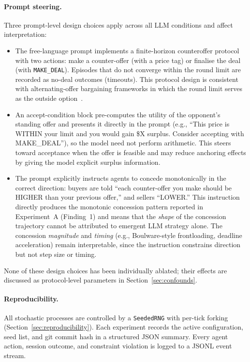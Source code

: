 \paragraph{Prompt steering.}
Three prompt-level design choices apply across all LLM conditions and affect interpretation:

\begin{itemize}
    \item The free-language prompt implements a finite-horizon counteroffer protocol with two actions: make a counter-offer (with a price tag) or finalise the deal (with \texttt{MAKE\_DEAL}).  Episodes that do not converge within the round limit are recorded as no-deal outcomes (timeouts).  This protocol design is consistent with alternating-offer bargaining frameworks in which the round limit serves as the outside option~\cite{rubinstein1982}.

    \item An accept-condition block pre-computes the utility of the opponent's standing offer and presents it directly in the prompt (e.g., ``This price is WITHIN your limit and you would gain \$X surplus.  Consider accepting with MAKE\_DEAL''), so the model need not perform arithmetic.  This steers toward acceptance when the offer is feasible and may reduce anchoring effects by giving the model explicit surplus information.

    \item The prompt explicitly instructs agents to concede monotonically in the correct direction: buyers are told ``each counter-offer you make should be HIGHER than your previous offer,'' and sellers ``LOWER.''  This instruction directly produces the monotonic concession pattern reported in Experiment~A (Finding~1) and means that the \emph{shape} of the concession trajectory cannot be attributed to emergent LLM strategy alone.  The concession \emph{magnitude} and \emph{timing} (e.g., Boulware-style frontloading, deadline acceleration) remain interpretable, since the instruction constrains direction but not step size or timing.
\end{itemize}

None of these design choices has been individually ablated; their effects are discussed as protocol-level parameters in Section~\ref{sec:confounds}.

\paragraph{Reproducibility.}
All stochastic processes are controlled by a \texttt{SeededRNG} with per-tick forking (Section~\ref{sec:reproducibility}).  Each experiment records the active configuration, seed list, and git commit hash in a structured JSON summary.  Every agent action, session outcome, and constraint violation is logged to a JSONL event stream.

